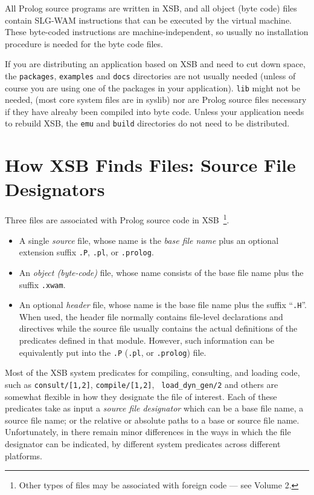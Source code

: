 \noindent
All Prolog source programs are written in XSB, and all object (byte
code) files contain SLG-WAM instructions that can be executed by the
virtual machine.  These byte-coded instructions are
machine-independent, so usually no installation procedure is needed
for the byte code files.

If you are distributing an application based on XSB and need to cut
down space, the {\tt packages}, {\tt examples} and {\tt docs}
directories are not usually needed (unless of course you are using one
of the packages in your application).  {\tt lib} might not be needed,
(most core system files are in syslib) nor are Prolog source files
necessary if they have alreaby been compiled into byte code.  Unless
your application needs to rebuild XSB, the {\tt emu} and {\tt build}
directories do not need to be distributed.

\section{How XSB Finds Files: Source File Designators}  \label{sec:filenames}
%
Three files are associated with Prolog source code in
XSB~\footnote{Other types of files may be associated with foreign code
--- see Volume 2.}.
\begin{itemize}
\item A single {\it source} file, whose name is the {\em base file
  name} plus an optional extension suffix {\tt .P}, {\tt .pl}, or {\tt .prolog}.
\item An {\it object (byte-code)} file, whose name consists of the
  base file name plus the suffix {\tt .xwam}.
\item An optional {\it header} file, whose name is the base file name
  plus the suffix ``{\tt .H}''.  When used, the header file normally
  contains file-level declarations and directives while the source
  file usually contains the actual definitions of the predicates
  defined in that module.  However, such information can be
  equivalently put into the {\tt .P} ({\tt .pl}, or {\tt .prolog}) file.
\end{itemize}
%
Most of the XSB system predicates for compiling, consulting, and
loading code, such as {\tt consult/[1,2]}, {\tt compile/[1,2]}, {\tt
  load\_dyn\_gen/2} and others are somewhat flexible in how they
designate the file of interest.  Each of these predicates take as
input a {\em source file designator} which can be a base file name, a
source file name; or the relative or absolute paths to a base or
source file name.  Unfortunately, in \version{} there remain minor
differences in the ways in which the file designator can be indicated,
by different system predicates across different platforms.

